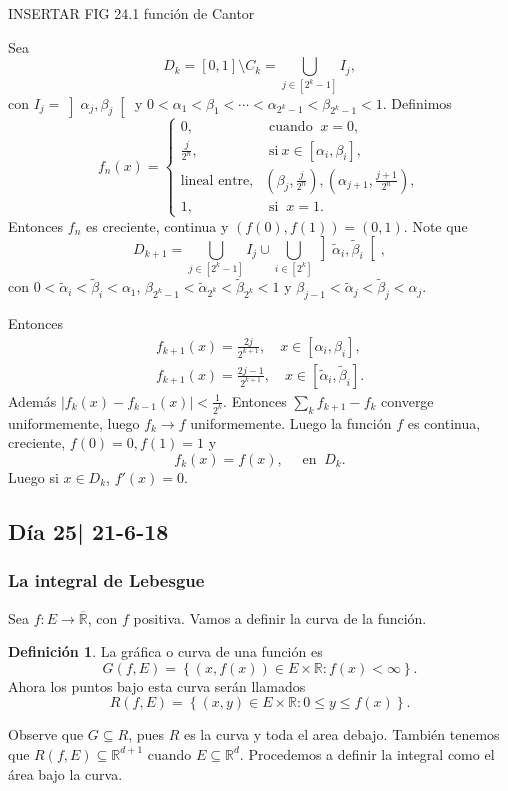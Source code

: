 \documentclass[12pt]{article}
\theoremstyle{plain}
\theoremstyle{definition}
\newtheorem{Def}[Th]{Definición}       %
\theoremstyle{remark}
\numberwithin{equation}{section}
\newcommand{\bR}{\mathbb{R}}        %
\renewcommand{\leq}{\leqslant}      %
\renewcommand{\:}{\colon}           %
\newcommand{\conj}[1]{\left\lbrace#1\right\rbrace}
\newcommand{\bonj}[1]{\left\lbrack#1\right\rbrack}
\newcommand{\obonj}[1]{\left\rbrack#1\right\lbrack}
\begin{document}
\begin{multicols}{2}
INSERTAR FIG 24.1 función de Cantor\par
Sea $$D_k=\bonj{0,1}\setminus C_k=\bigcup_{j\in\bonj{2^k-1}}I_j,$$
con $I_j=\obonj{\alpha_j,\beta_j}$ y $0<\alpha_1<\beta_1<\cdots<\alpha_{2^k-1}<\beta_{2^k-1}<1$. Definimos
$$
f_n(x)
=\begin{cases}
  0, &\text{ cuando }\ x=0,\\
   \frac{j}{2^n}, &\text{ si}\ x\in\bonj{\alpha_i,\beta_i},\\
   \text{lineal entre}, &(\beta_j,\frac{j}{2^n}),(\alpha_{j+1},\frac{j+1}{2^n}),\\
   1, &\text{ si }\ x=1.
 \end{cases}
$$
Entonces $f_n$ es creciente, continua y $(f(0),f(1))=(0,1)$. Note que
$$D_{k+1}=\bigcup_{j\in\bonj{2^k-1}}I_j\cup\bigcup_{i\in\bonj{2^k}}\obonj{\tilde{\alpha}_i,\tilde{\beta}_i},$$
con $0<\tilde{\alpha}_i<\tilde{\beta}_i<\alpha_1$, $\beta_{2^k-1}<\tilde{\alpha}_{2^k}<\tilde{\beta}_{2^k}<1$ y $\beta_{j-1}<\tilde{\alpha}_{j}<\tilde{\beta}_{j}<\alpha_j$.\par
Entonces
\begin{gather*}
  f_{k+1}(x)=\frac{2j}{2^{k+1}},\quad x\in\bonj{\alpha_i,\beta_i},\\
  f_{k+1}(x)=\frac{2j-1}{2^{k+1}},\quad x\in\bonj{\tilde{\alpha}_i,\tilde{\beta}_i}.
\end{gather*}
Además $|f_k(x)-f_{k-1}(x)|<\frac{1}{2^{k}}$. Entonces $\sum_{k}f_{k+1}-f_k$ converge uniformemente, luego $f_k\to f$ uniformemente. Luego la función $f$ es continua, creciente, $f(0)=0, f(1)=1$ y
$$f_k(x)=f(x),\quad\text{ en }\ D_k.$$
Luego si $x\in D_k$, $f'(x)=0$.

\subsection{Día 25| 21-6-18}

\subsubsection*{La integral de Lebesgue}

Sea $f\: E\to\overline{\bR}$, con $f$ positiva. Vamos a definir la curva de la función.

\begin{Def}
  La gráfica o curva de una función es
  $$G(f,E)=\conj{(x,f(x))\in E\times\bR\: f(x)<\infty}.$$
  Ahora los puntos bajo esta curva serán llamados
  $$R(f,E)=\conj{(x,y)\in E\times\bR\: 0\leq y\leq f(x)}.$$
\end{Def}
Observe que $G\subseteq R$, pues $R$ es la curva y toda el area debajo. También tenemos que $R(f,E)\subseteq\bR^{d+1}$ cuando $E\subseteq\bR^d$. Procedemos a definir la integral como el área bajo la curva.


\end{multicols}
\end{document}
